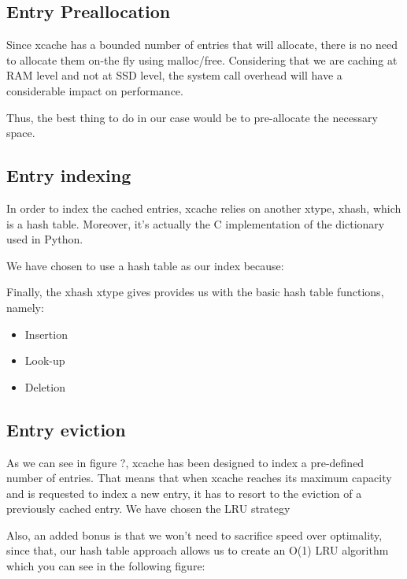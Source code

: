 \subsection{Entry Preallocation}\label{sec:entry-prealloc-design}

Since xcache has a bounded number of entries that will allocate, there is no 
need to allocate them on-the fly using malloc/free. Considering that we are 
caching at RAM level and not at SSD level, the system call overhead will have a 
considerable impact on performance.

Thus, the best thing to do in our case would be to pre-allocate the necessary 
space.

\subsection{Entry indexing}\label{sec:xcache-index-design}

In order to index the cached entries, xcache relies on another xtype, xhash, 
which is a hash table. Moreover, it's actually the C implementation of the 
dictionary used in Python.

We have chosen to use a hash table as our index because:

Finally, the xhash xtype gives provides us with the basic hash table functions, 
namely:

\begin{itemize}
	\item Insertion
	\item Look-up
	\item Deletion
\end{itemize}

\subsection{Entry eviction}

As we can see in figure ?, xcache has been designed to index a pre-defined 
number of entries. That means that when xcache reaches its maximum capacity and 
is requested to index a new entry, it has to resort to the eviction of a 
previously cached entry. We have chosen the LRU strategy 

Also, an added bonus is that we won't need to sacrifice speed over optimality, 
since that, our hash table approach allows us to create an O(1) LRU algorithm 
which you can see in the following figure:

